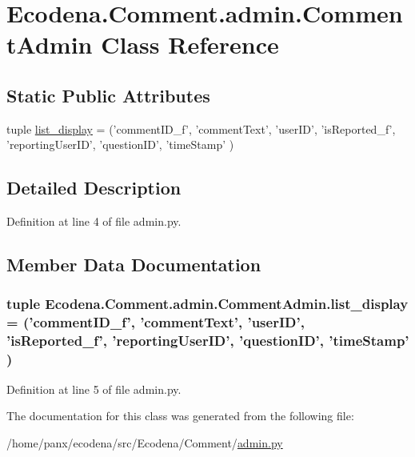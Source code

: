 \hypertarget{class_ecodena_1_1_comment_1_1admin_1_1_comment_admin}{
\section{Ecodena.Comment.admin.CommentAdmin Class Reference}
\label{dc/d4e/class_ecodena_1_1_comment_1_1admin_1_1_comment_admin}
}
\subsection*{Static Public Attributes}
\begin{DoxyCompactItemize}
\item 
tuple \hyperlink{class_ecodena_1_1_comment_1_1admin_1_1_comment_admin_affbe60dd670cc7ce903bdee9857e4e8b}{list\_\-display} = ('commentID\_\-f', 'commentText', 'userID', 'isReported\_\-f', 'reportingUserID', 'questionID', 'timeStamp' )
\end{DoxyCompactItemize}


\subsection{Detailed Description}


Definition at line 4 of file admin.py.



\subsection{Member Data Documentation}
\hypertarget{class_ecodena_1_1_comment_1_1admin_1_1_comment_admin_affbe60dd670cc7ce903bdee9857e4e8b}{
\subsubsection[{list\_\-display}]{\setlength{\rightskip}{0pt plus 5cm}tuple {\bf Ecodena.Comment.admin.CommentAdmin.list\_\-display} = ('commentID\_\-f', 'commentText', 'userID', 'isReported\_\-f', 'reportingUserID', 'questionID', 'timeStamp' )}}
\label{dc/d4e/class_ecodena_1_1_comment_1_1admin_1_1_comment_admin_affbe60dd670cc7ce903bdee9857e4e8b}


Definition at line 5 of file admin.py.



The documentation for this class was generated from the following file:\begin{DoxyCompactItemize}
\item 
/home/panx/ecodena/src/Ecodena/Comment/\hyperlink{_comment_2admin_8py}{admin.py}\end{DoxyCompactItemize}
